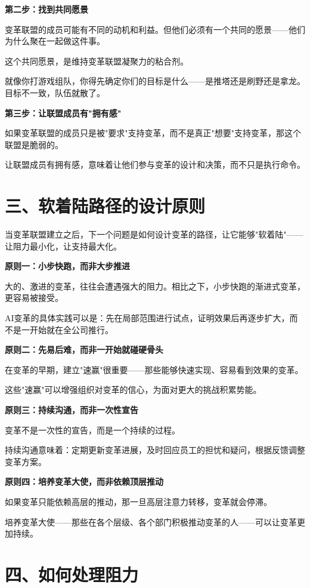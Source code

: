 \textbf{第二步：找到共同愿景}

变革联盟的成员可能有不同的动机和利益。但他们必须有一个共同的愿景——他们为什么聚在一起做这件事。

这个共同愿景，是维持变革联盟凝聚力的粘合剂。

就像你打游戏组队，你得先确定你们的目标是什么——是推塔还是刷野还是拿龙。目标不一致，队伍就散了。

\textbf{第三步：让联盟成员有"拥有感"}

如果变革联盟的成员只是被"要求"支持变革，而不是真正"想要"支持变革，那这个联盟是脆弱的。

让联盟成员有拥有感，意味着让他们参与变革的设计和决策，而不只是执行命令。

\section{三、软着陆路径的设计原则}


当变革联盟建立之后，下一个问题是如何设计变革的路径，让它能够"软着陆"——让阻力最小化，让支持最大化。

\textbf{原则一：小步快跑，而非大步推进}

大的、激进的变革，往往会遭遇强大的阻力。相比之下，小步快跑的渐进式变革，更容易被接受。

AI变革的具体实践可以是：先在局部范围进行试点，证明效果后再逐步扩大，而不是一开始就在全公司推行。

\textbf{原则二：先易后难，而非一开始就碰硬骨头}

在变革的早期，建立"速赢"很重要——那些能够快速实现、容易看到效果的变革。

这些"速赢"可以增强组织对变革的信心，为面对更大的挑战积累势能。

\textbf{原则三：持续沟通，而非一次性宣告}

变革不是一次性的宣告，而是一个持续的过程。

持续沟通意味着：定期更新变革进展，及时回应员工的担忧和疑问，根据反馈调整变革方案。

\textbf{原则四：培养变革大使，而非依赖顶层推动}

如果变革只能依赖高层的推动，那一旦高层注意力转移，变革就会停滞。

培养变革大使——那些在各个层级、各个部门积极推动变革的人——可以让变革更加持续。

\section{四、如何处理阻力}


